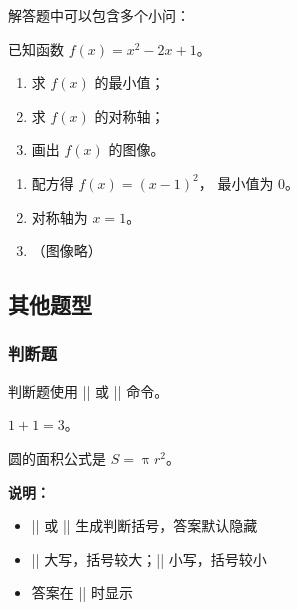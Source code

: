 解答题中可以包含多个小问：

\begin{latexcode}
  \begin{problem}[points = 12]
    已知函数 $f(x) = x^2 - 2x + 1$。
    \begin{enumerate}
      \item 求 $f(x)$ 的最小值；
      \item 求 $f(x)$ 的对称轴；
      \item 画出 $f(x)$ 的图像。
    \end{enumerate}

    \begin{solution}
      \begin{enumerate}
        \item 配方得 $f(x) = (x-1)^2$，
              最小值为 $0$。
        \item 对称轴为 $x = 1$。
        \item （图像略）
      \end{enumerate}
    \end{solution}
  \end{problem}
\end{latexcode}


\subsection{其他题型}

\subsubsection{判断题}

判断题使用 |\TF| 或 |\tf| 命令。

\begin{latexcode}
  \begin{question}
    $1 + 1 = 3$。\TF[F]
  \end{question}

  \begin{question}
    圆的面积公式是 $S = \uppi r^2$。\tf[T]
  \end{question}
\end{latexcode}

\textbf{说明：}
\begin{itemize}
  \item |\TF[T]| 或 |\TF[F]| 生成判断括号，答案默认隐藏
  \item |\TF| 大写，括号较大；|\tf| 小写，括号较小
  \item 答案在 || 时显示
\end{itemize}

